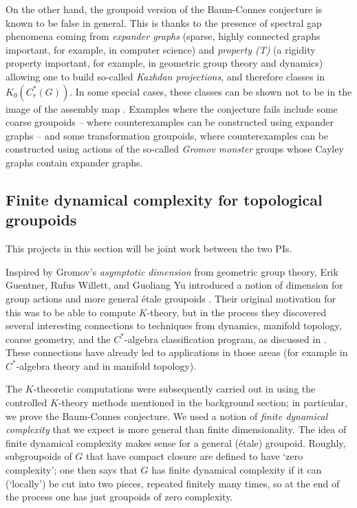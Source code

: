 \documentclass[11pt]{article}
\theoremstyle{plain}
\theoremstyle{definition}
\theoremstyle{remark}
\begin{document}
On the other hand, the groupoid version of the Baum-Connes conjecture is known to be false in general.  This is thanks to the presence of spectral gap phenomena coming from \emph{expander graphs} \cite{Lubotzky:1994tw} (sparse, highly connected graphs important, for example, in computer science) and \emph{property (T)} \cite{Bekka:2000kx} (a rigidity property important, for example, in geometric group theory and dynamics) allowing one to build so-called \emph{Kazhdan projections}, and therefore classes in $K_0(C^*_r(G))$.  In some special cases, these classes can be shown not to be in the image of the assembly map \cite{Higson:2002la}.  Examples where the conjecture fails include some coarse groupoids -- where counterexamples can be constructed using expander graphs -- and some transformation groupoids, where counterexamples can be constructed using actions of the so-called \emph{Gromov monster} groups whose Cayley graphs contain expander graphs.  













 
 
 
\subsection{Finite dynamical complexity for topological groupoids}

This projects in this section will be joint work between the two PIs.

Inspired by Gromov's \emph{asymptotic dimension} \cite[Section 1.E]{Gromov:1993tr} from geometric group theory, Erik Guentner, Rufus Willett, and Guoliang Yu introduced a notion of dimension for group actions and more general \'{e}tale groupoids \cite{Guentner:2014aa}.  Their original motivation for this was to be able to compute $K$-theory, but in the process they discovered several interesting connections to techniques from dynamics, manifold topology, coarse geometry, and the $C^*$-algebra classification program, as discussed in \cite{Guentner:2014aa}.  These connections have already led to applications in those areas (for example \cite{Deeley:2016aa} in $C^*$-algebra theory and \cite{Bartels:2016aa} in manifold topology).  

The $K$-theoretic computations were subsequently carried out in \cite{Guentner:2014bh} using the controlled $K$-theory methods mentioned in the background section; in particular, we prove the Baum-Connes conjecture.  We used a notion of \emph{finite dynamical complexity} that we expect is more general than finite dimensionality.  The idea of finite dynamical complexity makes sense for a general (\'{e}tale) groupoid.  Roughly, subgroupoids of $G$ that have compact closure are defined to have `zero complexity'; one then says that $G$ has finite dynamical complexity if it can (`locally') be cut into two pieces, repeated finitely many times, so at the end of the process one has just groupoids of zero complexity.
\end{document}
